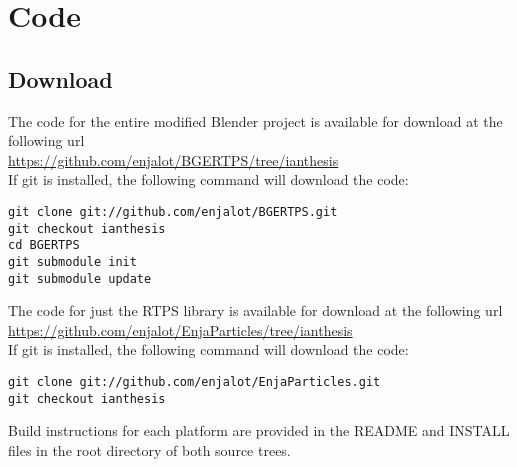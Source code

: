 \chapter{Code}
\section{Download}
\label{appendix:download}
The code for the entire modified Blender project is available for download at the following url \\
\url{https://github.com/enjalot/BGERTPS/tree/ianthesis} \\
If git\cite{Git} is installed, the following command will
download the code: 
\begin{verbatim}
git clone git://github.com/enjalot/BGERTPS.git
git checkout ianthesis
cd BGERTPS
git submodule init
git submodule update
\end{verbatim} 

The code for just the RTPS library is available for download at the following url \\ 
\url{https://github.com/enjalot/EnjaParticles/tree/ianthesis} \\
If git\cite{Git} is installed, the following command will
download the code: 
\begin{verbatim}
git clone git://github.com/enjalot/EnjaParticles.git
git checkout ianthesis
\end{verbatim} 


Build instructions for each platform are provided in the README and INSTALL
files in the root directory of both source trees.


